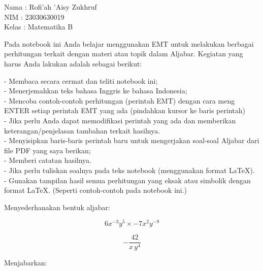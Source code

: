 \documentclass{article}
\begin{document}
\begin{eulernotebook}
\begin{eulercomment}
Nama  : Rofi'ah 'Aisy Zukhruf\\
NIM   : 23030630019\\
Kelas : Matematika B\\
\end{eulercomment}
\eulersubheading{}
\begin{eulercomment}
\begin{eulercomment}
\begin{eulercomment}
Pada notebook ini Anda belajar menggunakan EMT untuk melakukan
berbagai perhitungan terkait dengan materi atau topik dalam Aljabar.
Kegiatan yang harus Anda lakukan adalah sebagai berikut:

- Membaca secara cermat dan teliti notebook ini;\\
- Menerjemahkan teks bahasa Inggris ke bahasa Indonesia;\\
- Mencoba contoh-contoh perhitungan (perintah EMT) dengan cara meng
ENTER setiap perintah EMT yang ada (pindahkan kursor ke baris
perintah)\\
- Jika perlu Anda dapat memodifikasi perintah yang ada dan memberikan
keterangan/penjelasan tambahan terkait hasilnya.\\
- Menyisipkan baris-baris perintah baru untuk mengerjakan soal-soal
Aljabar dari file PDF yang saya berikan;\\
- Memberi catatan hasilnya.\\
- Jika perlu tuliskan soalnya pada teks notebook (menggunakan format
LaTeX).\\
- Gunakan tampilan hasil semua perhitungan yang eksak atau simbolik
dengan format LaTeX. (Seperti contoh-contoh pada notebook ini.)

\end{eulercomment}
\begin{eulercomment}
Menyederhanakan bentuk aljabar:

\end{eulercomment}
\begin{eulerformula}
\[
6x^{-3}y^5\times -7x^2y^{-9}
\]
\end{eulerformula}
\begin{eulercomment}
\end{eulercomment}
\begin{eulerformula}
\[
-\frac{42}{x\,y^4}
\]
\end{eulerformula}
\begin{eulercomment}
Menjabarkan:


\end{eulercomment}
\end{eulercomment}
\end{eulercomment}
\end{eulernotebook}
\end{document}
